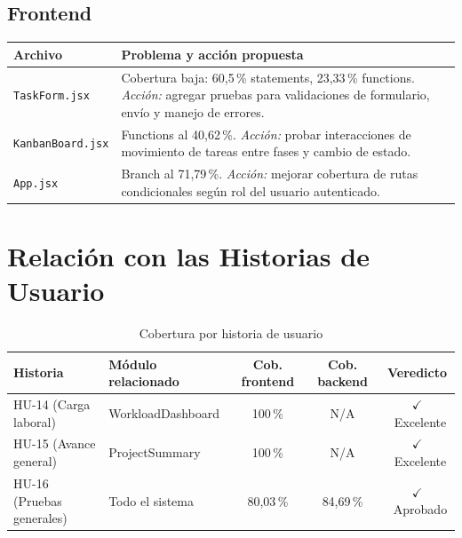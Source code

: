 \documentclass[12pt, a4paper]{article}
\newcommand{\ok}{\textcolor{accentgreen}{$\checkmark$}}
\begin{document}
\subsection{Frontend}

\begin{mejorabox}
\begin{tabularx}{\linewidth}{lX}
\toprule
\textbf{Archivo} & \textbf{Problema y acción propuesta} \\
\midrule
\texttt{TaskForm.jsx} &
  Cobertura baja: 60,5\,\% statements, 23,33\,\% functions.
  \textit{Acción:} agregar pruebas para validaciones de formulario, envío y manejo de errores. \\[4pt]
\texttt{KanbanBoard.jsx} &
  Functions al 40,62\,\%.
  \textit{Acción:} probar interacciones de movimiento de tareas entre fases y cambio de estado. \\[4pt]
\texttt{App.jsx} &
  Branch al 71,79\,\%.
  \textit{Acción:} mejorar cobertura de rutas condicionales según rol del usuario autenticado. \\
\bottomrule
\end{tabularx}
\end{mejorabox}

\section{Relación con las Historias de Usuario}

\begin{table}[H]
\centering
\renewcommand{\arraystretch}{1.5}
\begin{tabularx}{\linewidth}{p{2.2cm}p{3.5cm}ccc}
\toprule
\rowcolor{lightblue}
\textbf{Historia} & \textbf{Módulo relacionado} & \textbf{Cob. frontend}
& \textbf{Cob. backend} & \textbf{Veredicto} \\
\midrule
\rowcolor{coverok}
HU-14 (Carga laboral)    & WorkloadDashboard & 100\,\% & N/A & \ok\ Excelente \\
\rowcolor{coverok}
HU-15 (Avance general)   & ProjectSummary    & 100\,\% & N/A & \ok\ Excelente \\
\rowcolor{coverok}
HU-16 (Pruebas generales) & Todo el sistema  & 80,03\,\% & 84,69\,\% & \ok\ Aprobado \\
\bottomrule
\end{tabularx}
\caption{Cobertura por historia de usuario}
\end{table}

\end{document}

